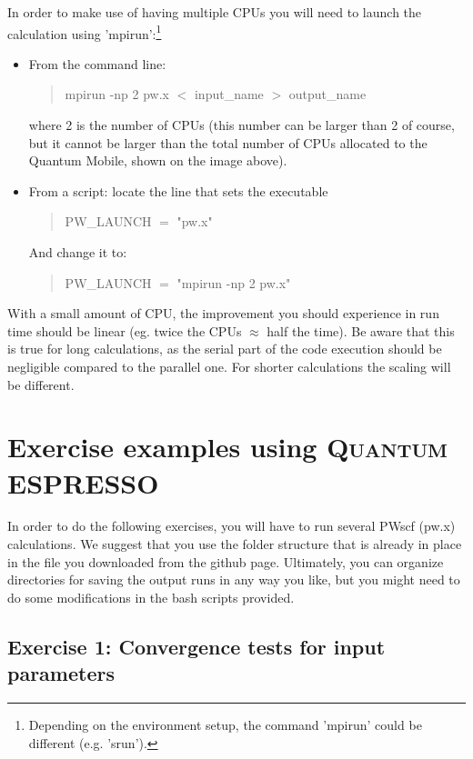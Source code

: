 \documentclass[12pt]{article}
\newcommand{\code}[1]{
\begin{quotation}
  #1 
\end{quotation}
}
\def\QE{\textsc{Quantum ESPRESSO}\xspace}
\begin{document}
    \vspace{6mm}
    In order to make use of having multiple CPUs you will need to launch the
    calculation using 'mpirun':\footnote{Depending on the environment setup, the command 'mpirun' could be different (e.g.  'srun').}
    \begin{itemize}
      \item From the command line:
            \code{mpirun -np 2 pw.x $<$ input\_name $>$ output\_name}
      where 2 is the number of CPUs (this number can be larger than 2 of course, but it cannot be larger than the total number of CPUs allocated to the Quantum Mobile, shown on the image above).

      \item From a script: locate the line that sets the executable
            \code{PW\_LAUNCH $=$ "pw.x"}
            And change it to:
            \code{PW\_LAUNCH $=$ "mpirun -np 2 pw.x"}

    \end{itemize}

    With a small amount of CPU, the improvement you should experience in
    run time should be linear (eg. twice the CPUs $\approx$ half the time).
    Be aware that this is true for long calculations, as the serial part of
    the code execution should be negligible compared to the parallel one.
    For shorter calculations the scaling will be different.


\newpage
\section{Exercise examples using \QE}

In order to do the following exercises, you will have to run several PWscf (pw.x)
calculations.
We suggest that you use the folder structure that is already in place in the
file you downloaded from the github page.
Ultimately, you can organize directories for saving the output runs in any way
you like, but you might need to do some modifications in the bash scripts provided.

\vspace{6mm}
\subsection{Exercise 1: Convergence tests for input parameters}


\vspace{6mm}
\end{document}

